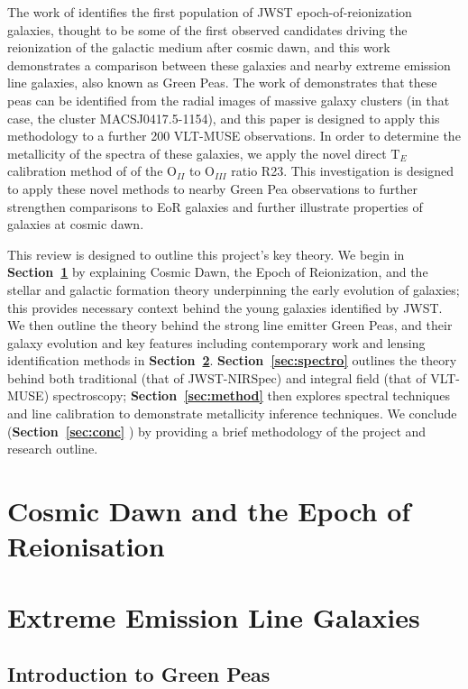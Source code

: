 \documentclass[fleqn,usenatbib]{mnras}
\begin{document}
The work of \cite{Rhoads} identifies the first population of JWST epoch-of-reionization galaxies, thought to be some of the first observed candidates driving the reionization of the galactic medium after cosmic dawn, and this work demonstrates a comparison between these galaxies and nearby extreme emission line galaxies, also known as Green Peas. The work of \cite{jauzac} demonstrates that these peas can be identified from the radial images of massive galaxy clusters (in that case, the cluster MACSJ0417.5-1154), and this paper is designed to apply this methodology to a further 200 VLT-MUSE observations. In order to determine the metallicity of the spectra of these galaxies, we apply the novel direct $\mathrm{T}_E$ calibration method of \cite{jiang} of the O$_{II}$ to O$_{III}$ ratio R23. This investigation is designed to apply these novel methods to nearby Green Pea observations to further strengthen comparisons to EoR galaxies and further illustrate properties of galaxies at cosmic dawn. 

This review is designed to outline this project’s key theory. We begin in \textbf{Section~\ref{sec:cdawn}} by explaining Cosmic Dawn, the Epoch of Reionization, and the stellar and galactic formation theory underpinning the early evolution of galaxies; this provides necessary context behind the young galaxies identified by JWST. We then outline the theory behind the strong line emitter Green Peas, and their galaxy evolution and key features including contemporary work and lensing identification methods in \textbf{Section~\ref{sec:eelg}}. \textbf{Section~\ref{sec:spectro}} outlines the theory behind both traditional (that of JWST-NIRSpec) and integral field (that of VLT-MUSE) spectroscopy; \textbf{Section~\ref{sec:method}} then explores spectral techniques and line calibration to demonstrate metallicity inference techniques. We conclude (\textbf{Section~\ref{sec:conc}} ) by providing a brief methodology of the project and research outline.

\section{Cosmic Dawn and the Epoch of Reionisation}
\label{sec:cdawn}

\section{Extreme Emission Line Galaxies}
\label{sec:eelg}
\subsection{Introduction to Green Peas}
\end{document}
